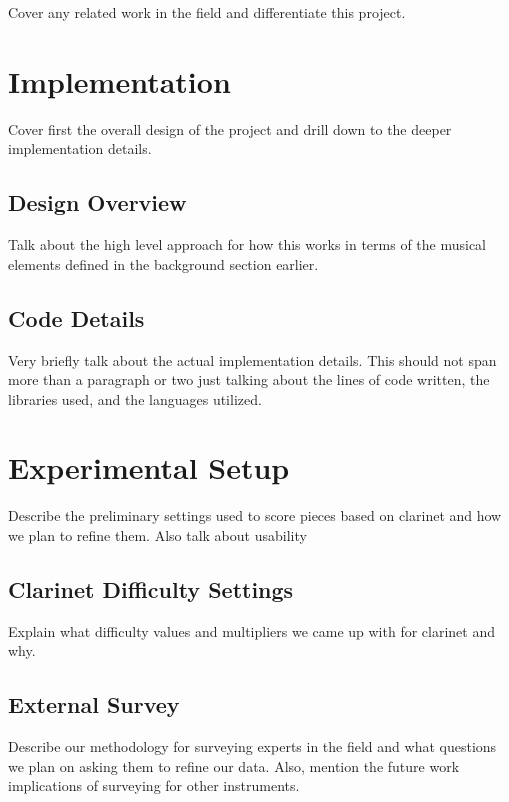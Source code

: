 \normalfont\documentclass[10pt]{sigplanconf}
\begin{document}
{Cover any related work in the field and differentiate this project.

\section{Implementation} 
\label{sec:imple}

Cover first the overall design of the project and drill down to the deeper implementation details.

\subsection{Design Overview} 
\label{sec:design}

Talk about the high level approach for how this works in terms of the musical elements defined in the background section earlier.

\subsection{Code Details} 
\label{sec:details}

Very briefly talk about the actual implementation details. This should not span more than a paragraph or two just talking about the lines of code written, the libraries used, and the languages utilized.

\section{Experimental Setup} 
\label{sec:experiment}

Describe the preliminary settings used to score pieces based on clarinet and how we plan to refine them. Also talk about usability

\subsection{Clarinet Difficulty Settings} 
\label{sec:settings}

Explain what difficulty values and multipliers we came up with for clarinet and why.

\subsection{External Survey} 
\label{sec:survey}

Describe our methodology for surveying experts in the field and what questions we plan on asking them to refine our data. Also, mention the future work implications of surveying for other instruments.

}
\end{document}
